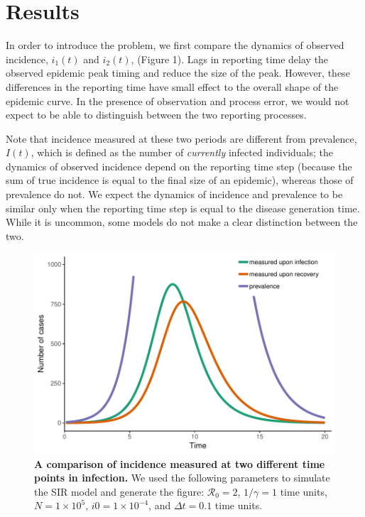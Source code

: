 \documentclass{article}\usepackage[]{graphicx}\usepackage[]{color}
\begin{document}
\section{Results}

In order to introduce the problem, we first compare the dynamics of observed 
incidence, $i_1(t)$ and $i_2(t)$, (Figure 1). Lags in reporting time delay 
the observed epidemic peak timing and reduce the size of the peak. However, 
these differences in the reporting time have small effect to the overall shape 
of the epidemic curve. In the presence of observation and process error, we 
would not expect to be able to distinguish between the two reporting processes. 

Note that incidence measured at these two periods are different from prevalence,
$I(t)$, which is defined as the number of \emph{currently} infected individuals;
the dynamics of observed incidence depend on the reporting time step (because the sum of 
true incidence is equal to the final size of an epidemic), whereas those of
prevalence do not. We expect the dynamics of incidence and prevalence to be similar only when
the reporting time step is equal to the disease generation time. While it is
uncommon, some models do not make a clear distinction between the two.

\begin{figure}
\includegraphics[width=\textwidth]{../figure/example.pdf}
\caption{
\textbf{A comparison of incidence measured at two different time points in infection.}
We used the following parameters to simulate the SIR model and generate the figure: 
$\mathcal R_0 = 2$, $1/\gamma = 1$ time units, $N = 1 \times 10^5$, $i0 = 1 \times 10^{-4}$,
and $\Delta t = 0.1$ time units.
}
\end{figure}
\end{document}
